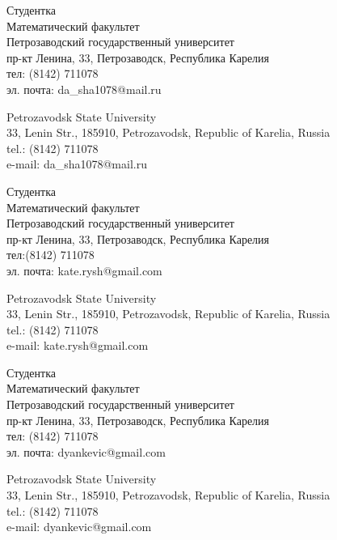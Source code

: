 \documentclass{article}
\begin{document}
\begin{aboutauthors}
Студентка\\ 
Математический факультет\\ 
Петрозаводский государственный университет\\
пр-кт Ленина, 33, Петрозаводск, Республика Карелия\\
тел: (8142) 711078\\
эл. почта: da\_sha1078@mail.ru

\columnbreak

Petrozavodsk State University\\
33, Lenin Str., 185910, Petrozavodsk, Republic of Karelia, Russia\\
tel.: (8142) 711078\\
e-mail: da\_sha1078@mail.ru
\end{aboutauthors}

\begin{aboutauthors}
Студентка\\ 
Математический факультет\\ 
Петрозаводский государственный университет\\
пр-кт Ленина, 33, Петрозаводск, Республика Карелия\\
тел:(8142) 711078\\
эл. почта: kate.rysh@gmail.com

\columnbreak

Petrozavodsk State University\\
33, Lenin Str., 185910, Petrozavodsk, Republic of Karelia, Russia\\
tel.: (8142) 711078\\
e-mail: kate.rysh@gmail.com 
\end{aboutauthors}

\begin{aboutauthors}
Студентка\\ 
Математический факультет\\ 
Петрозаводский государственный университет\\
пр-кт Ленина, 33, Петрозаводск, Республика Карелия\\
тел: (8142) 711078\\
эл. почта: dyankevic@gmail.com

\columnbreak

Petrozavodsk State University\\
33, Lenin Str., 185910, Petrozavodsk, Republic of Karelia, Russia\\
tel.: (8142) 711078\\
e-mail: dyankevic@gmail.com
\end{aboutauthors}
\end{document}
